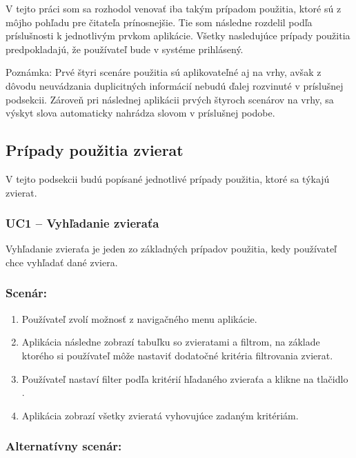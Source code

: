 V tejto práci som sa rozhodol venovať iba takým prípadom použitia, ktoré sú z môjho pohľadu pre čitateľa prínosnejšie. Tie som následne rozdelil podľa príslušnosti k jednotlivým prvkom aplikácie. Všetky nasledujúce prípady použitia predpokladajú, že používateľ bude v systéme prihlásený.

\hfill \break
Poznámka: Prvé štyri scenáre použitia sú aplikovateľné aj na vrhy, avšak z dôvodu neuvádzania duplicitných informácií nebudú ďalej rozvinuté v príslušnej podsekcii. Zároveň pri následnej aplikácii prvých štyroch scenárov na vrhy, sa výskyt slova  automaticky nahrádza slovom  v príslušnej podobe.

\subsection{Prípady použitia zvierat}
V tejto podsekcii budú popísané jednotlivé prípady použitia, ktoré sa týkajú zvierat.

\subsubsection*{UC1 -- Vyhľadanie zvieraťa}\label{uc1}

Vyhľadanie zvieraťa je jeden zo základných prípadov použitia, kedy používateľ chce vyhľadať dané zviera.

\subsubsection*{Scenár:}

\begin{enumerate}
	\item Používateľ zvolí možnosť  z navigačného menu aplikácie.
	\item Aplikácia následne zobrazí tabuľku so zvieratami a filtrom, na základe ktorého si používateľ môže nastaviť dodatočné kritéria filtrovania zvierat.
	\item Používateľ nastaví filter podľa kritérií hľadaného zvieraťa a klikne na tlačidlo .
	\item Aplikácia zobrazí všetky zvieratá vyhovujúce zadaným kritériám.
\end{enumerate}

\subsubsection*{Alternatívny scenár:}

